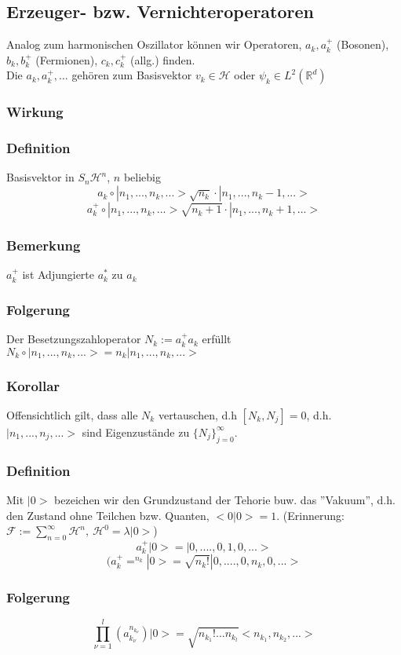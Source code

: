 \documentclass[twoside,a4paper]{scrartcl}
\newcommand{\R}{\mathbb{R}}
\renewcommand{\1}{\mathds{1}}
\renewcommand{\l}{\lambda}
\renewcommand{\H}{\mathcal{H}}
\newcommand{\F}{\mathcal{F}}
\renewcommand{\R}{\mathbb{R}}
\begin{document}
\subsection{Erzeuger- bzw. Vernichteroperatoren} 
Analog zum harmonischen Oszillator können wir Operatoren, $a_k,a^+_k$ (Bosonen), $b_k,b^+_k$ (Fermionen), $c_k,c^+_k$ (allg.) finden.\\
Die $a_k,a_k^+,...$ gehören zum Basisvektor $v_k\in \H$ oder $\psi_k \in L^2(\R^d)$
\subsubsection*{Wirkung} 
\subsubsection*{Definition} 
Basisvektor in $S_n\H^n$, $n$ beliebig
$$a_k \circ |n_1,...,n_k,...>\sqrt{n_k} \cdot |n_1,..., n_k-1,...>$$
$$a^+_k \circ |n_1,...,n_k,...>\sqrt{n_k+1} \cdot |n_1,..., n_k+1,...>$$
\subsubsection*{Bemerkung} 
$a_k^+$ ist Adjungierte $a_k^*$ zu $a_k$
\subsubsection*{Folgerung} 
Der Besetzungszahloperator $N_k:=a_k^+a_k$ erfüllt $N_k \circ |n_1,...,n_k,...>=n_k|n_1,...,n_k,...>$
\subsubsection*{Korollar} 
Offensichtlich gilt, dass alle $N_k$ vertauschen, d.h $[N_k,N_j]=0$, d.h. $|n_1,...,n_j,...>$ sind Eigenzustände zu $\{N_j\}_{j=0}^\infty$.
\subsubsection*{Definition} 
Mit $|0>$ bezeichen wir den Grundzustand der Tehorie buw. das ''Vakuum'', d.h. den Zustand ohne Teilchen bzw. Quanten, $<0|0>=1$. (Erinnerung: $\F:=\sum_{n=0}^\infty \H^n, \ \H^0=\l |0>$)
$$a_k^+|0>=|0,....,0,1,0,...>$$
$$(a_k^+=^{n_k}|0>=\sqrt{n_k!}|0,....,0,n_k,0,...>$$
\subsubsection*{Folgerung} 
$$\prod_{\nu=1}^l (a_{k_\nu}^{n_{k_\nu}})|0>=\sqrt{n_{k_1}!...n_{k_l}}<n_{k_1},n_{k_2},...>$$
\end{document}
